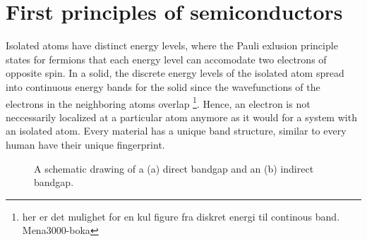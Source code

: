 \section{First principles of semiconductors}

Isolated atoms have distinct energy levels, where the Pauli exlusion principle \cite{Pauli1925} states for fermions that each energy level can accomodate two electrons of opposite spin. In a solid, the discrete energy levels of the isolated atom spread into continuous energy bands for the solid since the wavefunctions of the electrons in the neighboring atoms overlap \footnote{her er det mulighet for en kul figure fra diskret energi til continous band. Mena3000-boka}. Hence, an electron is not neccessarily localized at a particular atom anymore as it would for a system with an isolated atom. Every material has a unique band structure, similar to every human have their unique fingerprint.

\begin{figure}
  \begin{minipage}{\linewidth}
    \centering\captionsetup[subfigure]{justification=centering}
  \subcaption{}
  \label{fig:directbandgap}
  \label{fig:indirectbandgap}
  \subcaption{}
  \end{minipage}
  \caption{A schematic drawing of a (a) direct bandgap and an (b) indirect bandgap.}
\end{figure}

